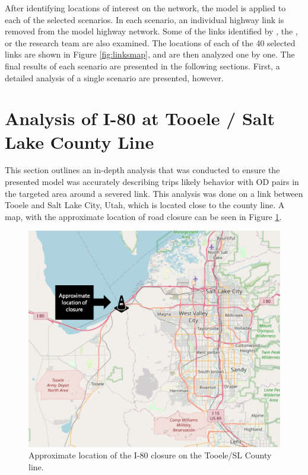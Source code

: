After identifying locations of interest on the network, the model is applied to
each of the selected scenarios. In each scenario, an individual highway
link is removed from the model highway network. Some of the links identified
by \citeauthor{aem2017}, the \citeauthor{riskanalysis}, or the research team are
also examined. The locations of each of the 40
selected links are shown in Figure \ref{fig:linksmap}, and are then analyzed one by one. The
final results of each scenario are presented in the following sections. First, a detailed analysis of a single
scenario are presented, however.

\section{Analysis of I-80 at Tooele / Salt Lake County Line}

This section outlines an in-depth analysis that was conducted to ensure
the presented model was accurately describing trips likely behavior with OD pairs in the
targeted area around a severed link. This analysis was done on a link between
Tooele and Salt Lake City, Utah, which is located close to the county line. A map, with the approximate
location of road closure can be seen in Figure \ref{fig:tooelemapwithcone}.

\begin{figure}

{\centering \includegraphics[width=0.75\linewidth]{figures/chapter4/tooelemapwithcone.png}

}

\caption{Approximate location of the I-80 closure on the Tooele/SL County line.}\label{fig:tooelemapwithcone}
\end{figure}

